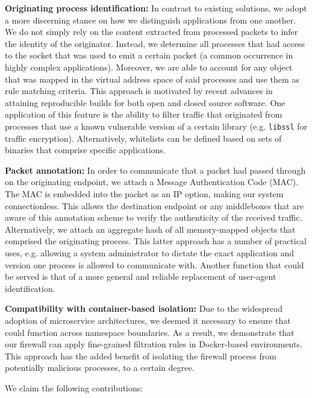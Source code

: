 \textbf{Originating process identification:} In contrast to existing solutions, we adopt a more discerning stance on how we distinguish applications from one another. We do not simply rely on the content extracted from processed packets to infer the identity of the originator. Instead, we determine all processes that had access to the socket that was used to emit a certain packet (a common occurrence in highly complex applications). Moreover, we are able to account for any object that was mapped in the virtual address space of said processes and use them as rule matching criteria. This approach is motivated by recent advances in attaining reproducible builds for both open and closed source software. One application of this feature is the ability to filter traffic that originated from processes that use a known vulnerable version of a certain library (e.g. \texttt{libssl} for traffic encryption). Alternatively, whitelists can be defined based on sets of binaries that comprise specific applications.

\textbf{Packet annotation:} In order to communicate that a packet had passed through \daf{} on the originating endpoint, we attach a Message Authentication Code (MAC). The MAC is embedded into the packet as an IP option, making our system connectionless. This allows the destination endpoint or any middleboxes that are aware of this annotation scheme to verify the authenticity of the received traffic. Alternatively, we attach an aggregate hash of all memory-mapped objects that comprised the originating process. This latter approach has a number of practical uses, e.g. allowing a system administrator to dictate the exact application and version one process is allowed to communicate with. Another function that could be served is that of a more general and reliable replacement of user-agent identification.

\textbf{Compatibility with container-based isolation:} Due to the widespread adoption of microservice architectures, we deemed it necessary to ensure that \daf{} could function across namespace boundaries. As a result, we demonstrate that our firewall can apply fine-grained filtration rules in Docker-based environments. This approach has the added benefit of isolating the firewall process from potentially malicious processes, to a certain degree.

We claim the following contributions:

